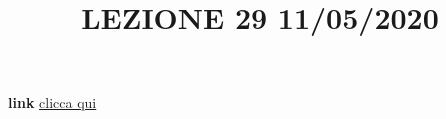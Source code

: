 \newline
\newline
\title{LEZIONE 29 11/05/2020}\newline
\textbf{link} \href{https://web.microsoftstream.com/video/7ed14c44-3a82-42d4-bf2e-fd00099ad481?list=user&userId=faa91214-a6f5-40d7-8875-253fd49b8ce1}{clicca qui}